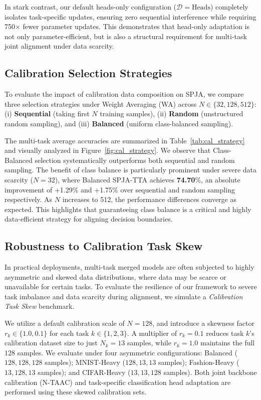 \documentclass{article}
\theoremstyle{plain}
\theoremstyle{definition}
\theoremstyle{remark}
\begin{document}
In stark contrast, our default heads-only configuration ($\mathcal{D}=\text{Heads}$) completely isolates task-specific updates, ensuring zero sequential interference while requiring 750$\times$ fewer parameter updates. This demonstrates that head-only adaptation is not only parameter-efficient, but is also a structural requirement for multi-task joint alignment under data scarcity.

\subsection{Calibration Selection Strategies}
To evaluate the impact of calibration data composition on SPJA, we compare three selection strategies under Weight Averaging (WA) across $N \in \{32, 128, 512\}$: (i) \textbf{Sequential} (taking first $N$ training samples), (ii) \textbf{Random} (unstructured random sampling), and (iii) \textbf{Balanced} (uniform class-balanced sampling).

The multi-task average accuracies are summarized in Table~\ref{tab:cal_strategy} and visually analyzed in Figure~\ref{fig:cal_strategy}. We observe that Class-Balanced selection systematically outperforms both sequential and random sampling. The benefit of class balance is particularly prominent under severe data scarcity ($N = 32$), where Balanced SPJA-TTA achieves \textbf{74.70}\%, an absolute improvement of +1.29\% and +1.75\% over sequential and random sampling respectively. As $N$ increases to 512, the performance differences converge as expected. This highlights that guaranteeing class balance is a critical and highly data-efficient strategy for aligning decision boundaries.

\subsection{Robustness to Calibration Task Skew}
In practical deployments, multi-task merged models are often subjected to highly asymmetric and skewed data distributions, where data may be scarce or unavailable for certain tasks. To evaluate the resilience of our framework to severe task imbalance and data scarcity during alignment, we simulate a \textit{Calibration Task Skew} benchmark. 

We utilize a default calibration scale of $N=128$, and introduce a skewness factor $r_k \in \{1.0, 0.1\}$ for each task $k \in \{1, 2, 3\}$. A multiplier of $r_k=0.1$ reduces task $k$'s calibration dataset size to just $N_k = 13$ samples, while $r_k=1.0$ maintains the full $128$ samples. We evaluate under four asymmetric configurations: Balanced ($128, 128, 128$ samples); MNIST-Heavy ($128, 13, 13$ samples); Fashion-Heavy ($13, 128, 13$ samples); and CIFAR-Heavy ($13, 13, 128$ samples). Both joint backbone calibration (N-TAAC) and task-specific classification head adaptation are performed using these skewed calibration sets.
\end{document}
